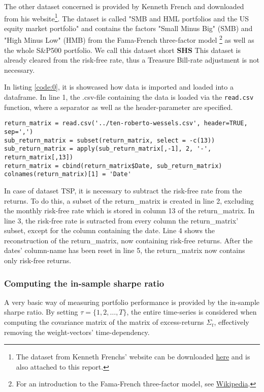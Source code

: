 The other dataset concerned is provided by Kenneth French and downloaded from his website\footnote{The dataset from Kenneth Frenchs' website can be downloaded \href{http://mba.tuck.dartmouth.edu/pages/faculty/ken.french/ftp/F-F_Research_Data_Factors_CSV.zip}{here} and is also attached to this report.}. The dataset is called "SMB and HML portfolios and the US equity market portfolio" and contains the factors "Small Minus Big" (SMB) and "High Minus Low" (HMB) from the Fama-French three-factor model \footnote{For an introduction to the Fama-French three-factor model, see \href{https://en.wikipedia.org/wiki/Fama\%E2\%80\%93French_three-factor_model}{Wikipedia}.} as well as the whole S\&P500 portfolio. We call this dataset short \textbf{SHS} This dataset is already cleared from the risk-free rate, thus a Treasure Bill-rate adjustment is not necessary.

In listing \ref{code:0}, it is showcased how data is imported and loaded into a dataframe. In line 1, the .csv-file containing the data is loaded via the \lstinline|read.csv| function, where a separator as well as the header-parameter are specified. 

\begin{lstlisting}[caption={Loading the data and subtracting the risk-free rate from the columns of returns yields a dataframe containing the matrix of excess-returns.}, label=code:0, frame=single]
return_matrix = read.csv('../ten-roberto-wessels.csv', header=TRUE, sep=',')
sub_return_matrix = subset(return_matrix, select = -c(13))
sub_return_matrix = apply(sub_return_matrix[,-1], 2, '-', return_matrix[,13])
return_matrix = cbind(return_matrix$Date, sub_return_matrix)
colnames(return_matrix)[1] = 'Date'
\end{lstlisting}
In case of dataset TSP, it is necessary to subtract the risk-free rate from the returns. To do this, a subset of the return\_matrix is created in line 2, excluding the monthly risk-free rate which is stored in column 13 of the return\_matrix. In line 3, the risk-free rate is sutracted from every column the return\_matrix' subset, except for the column containing the date. Line 4 shows the reconstruction of the return\_matrix, now containing risk-free returns. After the dates' column-name has been reset in line 5, the return\_matrix now contains only risk-free returns. 

\subsubsection{Computing the in-sample sharpe ratio}
A very basic way of measuring portfolio performance is provided by the in-sample sharpe ratio. By setting $\tau = \lbrace 1, 2, \dots, T \rbrace$, the entire time-series is considered when computing the covariance matrix of the matrix of excess-returns $\Sigma_t$, effectively removing the weight-vectors' time-dependency. \\

